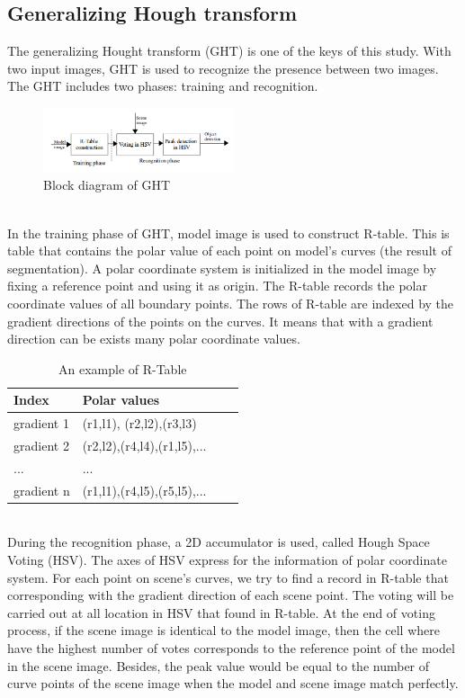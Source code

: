 \documentclass[twoside,twocolumn,10pt]{article}
\begin{document}
\subsection{Generalizing Hough transform}
The generalizing Hought transform (GHT)\cite{ballard1981generalizing} is one of the
keys of this study. With two input images, GHT is used to recognize
the presence between two images. The GHT includes two
phases: training and recognition.\\[0.1cm]

\begin{figure}[htb]
    \centering
    \includegraphics[width=0.5\textwidth]{./images/ghtdiagram}
    \caption{Block diagram of GHT}
    \label{fig:box}
\end{figure}~\\

In the training phase of GHT, model image is used to construct
R-table. This is table that contains the polar value of each point on
model's curves (the result of segmentation). A polar coordinate system
is initialized in the model image by fixing a reference point and
using it as origin. The R-table records the polar coordinate values of
all boundary points. The rows of R-table are indexed by the gradient
directions of the points on the curves. It means that with a gradient
direction can be exists many polar coordinate values.

\begin{table}[htb]
	\centering
	\begin{tabular}{|l|l|l|l|}
	\hline
	Index & Polar values \\
	\hline
	gradient 1 & (r1,l1), (r2,l2),(r3,l3) \\
	\hline
	gradient 2 & (r2,l2),(r4,l4),(r1,l5),... \\
	\hline
	... & ...\\
	\hline
	gradient n & (r1,l1),(r4,l5),(r5,l5),... \\
	\hline
	\end{tabular}
	\caption{An example of R-Table}
\end{table}~\\

During the recognition phase, a 2D accumulator is used, called Hough
Space Voting (HSV). The axes of HSV express for the information of
polar coordinate system. For each point on scene's curves, we try to
find a record in R-table that corresponding with the gradient
direction of each scene point. The voting will be carried out at all
location in HSV that found in R-table. At the end of voting process,
if the scene image is identical to the model image, then the cell
where have the highest number of votes corresponds to the reference
point of the model in the scene image. Besides, the peak value would
be equal to the number of curve points of the scene image when the
model and scene image match perfectly.
\end{document}

